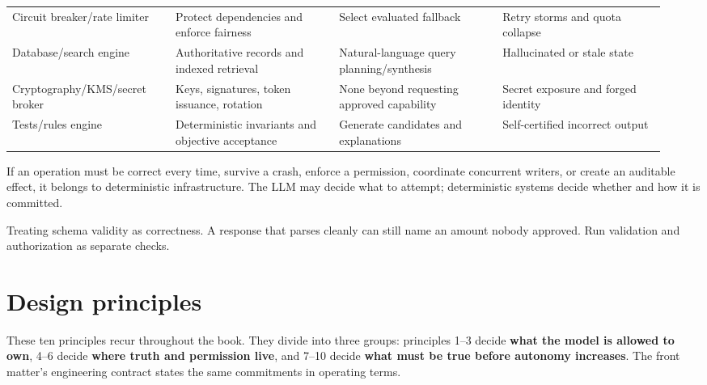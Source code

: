 \begin{longtable}{@{}Y{0.2350\linewidth}Y{0.2350\linewidth}Y{0.2350\linewidth}Y{0.2350\linewidth}@{}}
Circuit breaker/rate limiter & Protect dependencies and enforce fairness & Select evaluated fallback & Retry storms and quota collapse \\
Database/search engine & Authoritative records and indexed retrieval & Natural-language query planning/synthesis & Hallucinated or stale state \\
Cryptography/KMS/secret broker & Keys, signatures, token issuance, rotation & None beyond requesting approved capability & Secret exposure and forged identity \\
Tests/rules engine & Deterministic invariants and objective acceptance & Generate candidates and explanations & Self-certified incorrect output \\
\end{longtable}
\BookTableEnd

\begin{bookcallout}
If an operation must be correct every time, survive a crash, enforce a permission, coordinate concurrent writers, or create an auditable effect, it belongs to deterministic infrastructure. The LLM may decide what to attempt; deterministic systems decide whether and how it is committed.
\end{bookcallout}

\begin{bookantipattern}
Treating schema validity as correctness. A response that parses cleanly can still name an amount nobody approved. Run validation and authorization as separate checks.
\end{bookantipattern}

\section{Design principles}

These ten principles recur throughout the book. They divide into three groups: principles 1–3 decide \textbf{what the model is allowed to own}, 4–6 decide \textbf{where truth and permission live}, and 7–10 decide \textbf{what must be true before autonomy increases}. The front matter's engineering contract states the same commitments in operating terms.\par

